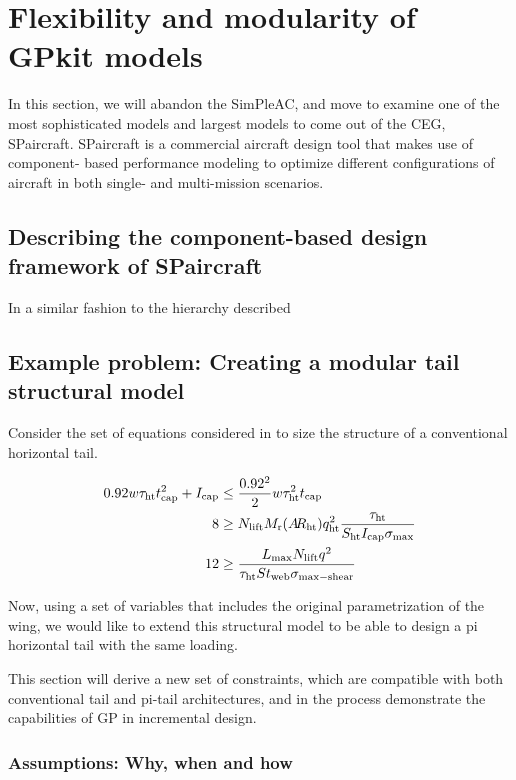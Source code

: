\chapter{Flexibility and modularity of GPkit models}

In this section, we will abandon the SimPleAC, and move to examine one of the
most sophisticated models and largest models to come out of the \gls{CEG}, SPaircraft.
SPaircraft is a commercial aircraft design tool that makes use of component-
based performance modeling to optimize different configurations of aircraft in
both single- and multi-mission scenarios.

\section{Describing the component-based design framework of SPaircraft}

In a similar fashion to the hierarchy described

\section{Example problem: Creating a modular tail structural model}

Consider the set of equations considered in \cite{SP_ac_design} to size
the structure of a conventional horizontal tail. 

\begin{align}
    0.92 w\tau_{\rm{ht}} t_{\rm{cap}}^2 + I_{\rm{cap}} &\leq \frac{0.92^2}{2}w\tau_{\rm{ht}}^2t_{\rm{cap}}\\
    8 &\geq N_{\rm{lift}}M_{\rm{r}}(A\hspace{-2.0pt}R_{\rm{ht}})q_{\rm{ht}}^2\frac{\tau_{\rm{ht}}}{S_{\rm{ht}} I_{\rm{cap}}\sigma_{\rm{max}}}\\
    12 &\geq \frac{L_{\rm{max}} N_{\rm{lift}} q^2}{\tau_{\rm{ht}} S t_{\rm{web}} \sigma_{\rm{max-shear}}}
\end{align}

Now, using a set of variables that includes the original parametrization of the wing, 
we would like to extend this structural model to be able to design a pi horizontal tail
with the same loading. 

This section will derive a new set of constraints, which are compatible with 
both conventional tail and pi-tail architectures, and in the process demonstrate the 
capabilities of \gls{GP} in incremental design. 



\subsection{Assumptions: Why, when and how}

